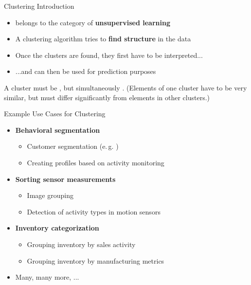 \begin{frame}{Clustering Introduction}{}
	\begin{itemize}
		\item {} belongs to the category of \textbf{unsupervised learning}
		\item A clustering algorithm tries to \textbf{find structure} in the data
		\item Once the clusters are found, they first have to be interpreted...
		\item ...and can then be used for prediction purposes
	\end{itemize}
	
	\vspace*{3mm}
	\begin{boxBlue}
		\footnotesize
		A cluster must be , but simultaneously .
		(Elements of one cluster have to be very similar, but must differ significantly from elements in other clusters.)
	\end{boxBlue}
\end{frame}


\begin{frame}{Example Use Cases for Clustering}{}
	\begin{itemize}
		\item \textbf{Behavioral segmentation}
		\begin{itemize}
			\item Customer segmentation (e.\,g. )
			\item Creating profiles based on activity monitoring
		\end{itemize}
		\item \textbf{Sorting sensor measurements}
		\begin{itemize}
			\item Image grouping
			\item Detection of activity types in motion sensors
		\end{itemize}
		\item \textbf{Inventory categorization}
		\begin{itemize}
			\item Grouping inventory by sales activity
			\item Grouping inventory by manufacturing metrics
		\end{itemize}
		\item Many, many more, ...
	\end{itemize}
\end{frame}


